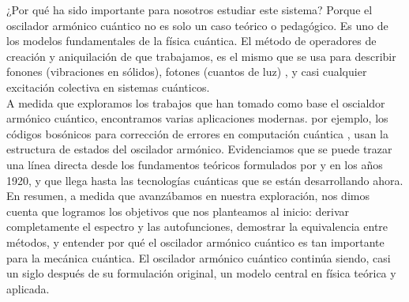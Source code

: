¿Por qué ha sido importante para nosotros estudiar este sistema? Porque el oscilador armónico cuántico no es solo un caso teórico o pedagógico. Es uno de los modelos fundamentales de la física cuántica. El método de operadores de creación y aniquilación de \cite{dirac1930} que trabajamos, es el mismo que se usa para describir fonones (vibraciones en sólidos), fotones (cuantos de luz) \citep{dirac1927}, y casi cualquier excitación colectiva en sistemas cuánticos.\\

A medida que exploramos los trabajos que han tomado como base el oscialdor armónico cuántico, encontramos varias aplicaciones modernas. por ejemplo, los códigos bosónicos para corrección de errores en computación cuántica \citep{cai2021bosonic}, usan la estructura de estados del oscilador armónico. Evidenciamos que se puede trazar una línea directa desde los fundamentos teóricos formulados por \cite{schrodinger1926b} y  \cite{dirac1930} en los años 1920, y que llega hasta las tecnologías cuánticas que se están desarrollando ahora.\\

En resumen, a medida que avanzábamos en nuestra exploración, nos dimos cuenta que logramos los objetivos que nos planteamos al inicio: derivar completamente el espectro y las autofunciones, demostrar la equivalencia entre métodos, y entender por qué el oscilador armónico cuántico es tan importante para la mecánica cuántica. El oscilador armónico cuántico continúa siendo, casi un siglo después de su formulación original, un modelo central en física teórica y aplicada.\\
